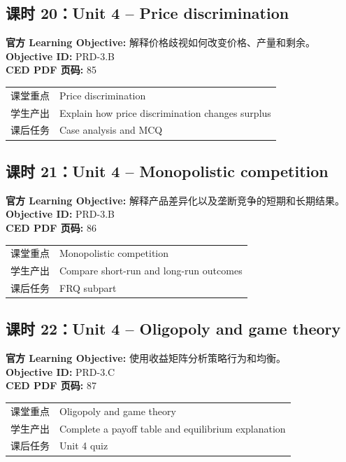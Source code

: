 \documentclass[11pt,a4paper]{ctexart}
\newcommand{\objectivebox}[1]{\noindent\colorbox{aplight}{\parbox{0.96\textwidth}{#1}}}
\begin{document}
\subsection{课时 20：Unit 4 -- Price discrimination}
\objectivebox{\textbf{官方 Learning Objective:} 解释价格歧视如何改变价格、产量和剩余。\\\textbf{Objective ID:} PRD-3.B\\\textbf{CED PDF 页码:} 85}\par\vspace{0.4em}
\begin{tabularx}{\textwidth}{p{3.0cm}Y}
\toprule
课堂重点 & Price discrimination\\
学生产出 & Explain how price discrimination changes surplus\\
课后任务 & Case analysis and MCQ\\
\bottomrule
\end{tabularx}
\subsection{课时 21：Unit 4 -- Monopolistic competition}
\objectivebox{\textbf{官方 Learning Objective:} 解释产品差异化以及垄断竞争的短期和长期结果。\\\textbf{Objective ID:} PRD-3.B\\\textbf{CED PDF 页码:} 86}\par\vspace{0.4em}
\begin{tabularx}{\textwidth}{p{3.0cm}Y}
\toprule
课堂重点 & Monopolistic competition\\
学生产出 & Compare short-run and long-run outcomes\\
课后任务 & FRQ subpart\\
\bottomrule
\end{tabularx}
\subsection{课时 22：Unit 4 -- Oligopoly and game theory}
\objectivebox{\textbf{官方 Learning Objective:} 使用收益矩阵分析策略行为和均衡。\\\textbf{Objective ID:} PRD-3.C\\\textbf{CED PDF 页码:} 87}\par\vspace{0.4em}
\begin{tabularx}{\textwidth}{p{3.0cm}Y}
\toprule
课堂重点 & Oligopoly and game theory\\
学生产出 & Complete a payoff table and equilibrium explanation\\
课后任务 & Unit 4 quiz\\
\bottomrule
\end{tabularx}
\end{document}
